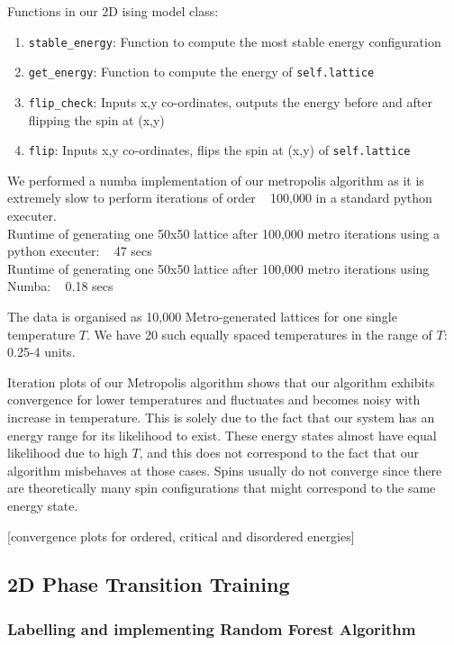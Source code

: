 Functions in our 2D ising model class:
\begin{enumerate}
    \item \texttt{stable\_energy}: Function to compute the most stable energy configuration
    \item \texttt{get\_energy}: Function to compute the energy of \texttt{self.lattice}
    \item \texttt{flip\_check}: Inputs x,y co-ordinates, outputs the energy before and after flipping the spin at (x,y)
    \item \texttt{flip}: Inputs x,y co-ordinates, flips the spin at (x,y) of \texttt{self.lattice}
\end{enumerate}

We performed a numba implementation of our metropolis algorithm as it is extremely slow to perform iterations of order ~ 100,000 in a standard python executer. \\
Runtime of generating one 50x50 lattice after 100,000 metro iterations using a python executer: ~ 47 secs\\
Runtime of generating one 50x50 lattice after 100,000 metro iterations using Numba: ~ 0.18 secs

The data is organised as 10,000 Metro-generated lattices for one single temperature $T$. We have 20 such equally spaced temperatures in the range of $T$: 0.25-4 units.

Iteration plots of our Metropolis algorithm shows that our algorithm exhibits convergence for lower temperatures and fluctuates and becomes noisy with increase in temperature.
This is solely due to the fact that our system has an energy range for its likelihood to exist.
These energy states almost have equal likelihood due to high $T$, and this does not correspond to the fact that our algorithm misbehaves at those cases.
Spins usually do not converge since there are theoretically many spin configurations that might correspond to the same energy state.

[convergence plots for ordered, critical and disordered energies]

\subsection{2D Phase Transition Training}

\subsubsection{Labelling and implementing Random Forest Algorithm}

